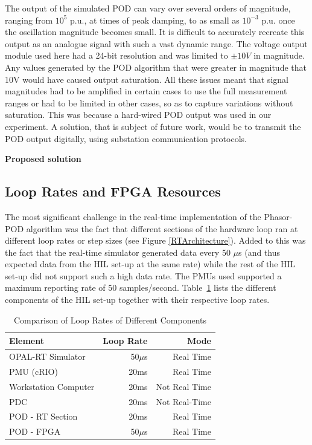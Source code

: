 \documentclass{ieeeaccess}
\begin{document}
The output of the simulated POD can vary over several orders of magnitude, ranging from $10^{5}$ p.u., at times of peak damping, to as small as $10^{-3}$ p.u. once the oscillation magnitude  becomes small. It is difficult to accurately recreate this output as an analogue signal with such a vast dynamic range. The voltage output module used here had a 24-bit resolution and was limited to $\pm 10V$ in magnitude. Any values generated by the POD algorithm that were greater in magnitude that 10V would have caused output saturation. All these issues meant that signal magnitudes had to be amplified in certain cases to use the full measurement ranges or had to be limited in other cases, so as to capture variations without saturation. This was because a hard-wired POD output was used in our experiment. A solution, that is subject of future work,  would be to transmit the POD output digitally, using substation communication protocols.

\textbf{Proposed solution}

\subsection{Loop Rates and FPGA Resources}\label{looprate}
The most significant challenge in the real-time implementation of the Phasor-POD algorithm was the fact that different sections of the hardware loop ran at different loop rates or step sizes (see Figure \ref{RTArchitecture}). Added to this was the fact that the real-time simulator generated data every 50 $\mu$s (and thus expected data from the HIL set-up at the same rate) while the rest of the HIL set-up did not support such a high data rate. The PMUs used supported a maximum reporting rate of 50 samples/second. Table~\ref{ex:LoopRates} lists the different components of the HIL set-up together with their respective loop rates.
\begin{table}[htpb]
\caption{Comparison of Loop Rates of Different Components}\label{ex:LoopRates}
\begin{center}
\begin{tabular}{|l|r|r|}
\hline \textbf{Element} & \textbf{Loop Rate} & \textbf{Mode} \\
\hline OPAL-RT Simulator & 50$\mu$s & Real Time \\ 
\hline PMU (cRIO) & 20ms & Real Time \\ 
\hline Workstation Computer& 20ms &Not Real Time\\ 
\hline PDC & 20ms &Not Real-Time\\ %
\hline POD - RT Section & 20ms & Real Time \\ 
\hline POD - FPGA & 50$\mu$s & Real Time \\ 
\hline 
\end{tabular}
\end{center}
\end{table} 
\end{document}
